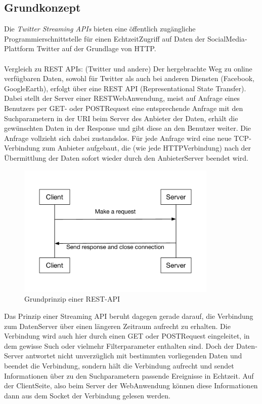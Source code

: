 \subsection{Grundkonzept}

Die \textit{Twitter Streaming APIs} bieten eine öffentlich zugängliche Programmierschnittstelle für einen Echtzeit­Zugriff auf Daten der Social­Media­Plattform Twitter auf der Grundlage von HTTP.
\\\\
Vergleich zu REST APIs: (Twitter und andere)
Der hergebrachte Weg zu online verfügbaren Daten, sowohl für Twitter als auch bei anderen
Diensten (Facebook, GoogleEarth), erfolgt über eine REST API (Representational State Transfer).
Dabei stellt der Server einer REST­Web­Anwendung, meist auf Anfrage eines Benutzers per GET-
oder POST­Request eine entsprechende Anfrage mit den Suchparametern in der URI beim Server
des Anbieter der Daten, erhält die gewünschten Daten in der Response und gibt diese an den
Benutzer weiter. Die Anfrage vollzieht sich dabei zustandslos. Für jede Anfrage wird eine neue
TCP­Verbindung zum Anbieter aufgebaut, die (wie jede HTTP­Verbindung) nach der
Übermittlung der Daten sofort wieder durch den Anbieter­Server beendet wird. \\

\begin{figure}[!h]
    \centering
    \includegraphics[width=0.85\textwidth]{Graphics/normal_rest_api}
    \caption{Grundprinzip einer REST-API}
   \label{fig:restapi}
\end{figure}
\newpage
Das Prinzip einer Streaming API beruht dagegen gerade darauf, die Verbindung zum Daten­Server
über einen längeren Zeitraum aufrecht zu erhalten. Die Verbindung wird auch hier durch einen
GET­ oder POST­Request eingeleitet, in dem gewisse Such­ oder vielmehr Filterparameter
enthalten sind. Doch der Daten­Server antwortet nicht unverzüglich mit bestimmten vorliegenden
Daten und beendet die Verbindung, sondern hält die Verbindung aufrecht und sendet
Informationen über zu den Suchparametern passende Ereignisse in Echtzeit. Auf der Client­Seite,
also beim Server der Web­Anwendung können diese Informationen dann aus dem Socket der
Verbindung gelesen werden. \\


